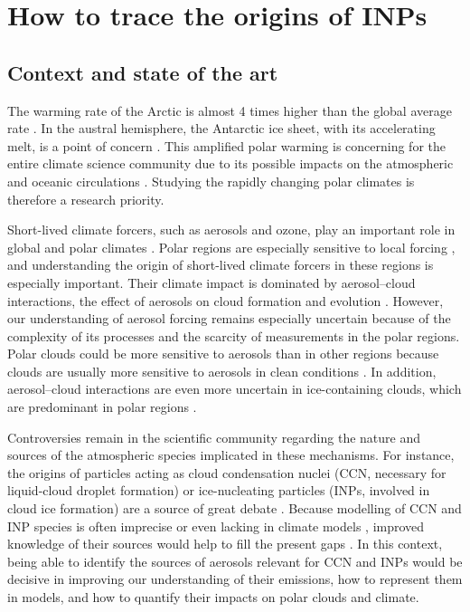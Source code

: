 \section{How to trace the origins of INPs}
\label{sec:paper1}
    \subsection{Context and state of the art}
    \label{P1sec:intro}

    The warming rate of the Arctic is almost 4 times higher than the global average  rate \citep{rantanen_arctic_2022}.
    In the austral hemisphere, the Antarctic ice sheet, with its accelerating melt, is a point of concern \citep{bronselaer_change_2018}. This amplified polar warming is concerning for the entire climate science community due to its possible impacts on the atmospheric and oceanic circulations \citep{serreze_processes_2011}.
    Studying the rapidly changing polar climates is therefore a research priority.

    Short-lived climate forcers, such as aerosols and ozone, play an important role in global and polar climates \citep{ipcc_sixth_2021}. Polar regions are especially sensitive to local forcing \citep{stuecker_polar_2018}, and understanding the origin of short-lived climate forcers in these regions is especially important. Their climate impact is dominated by aerosol--cloud interactions, the effect of aerosols on cloud formation and evolution \citep{storelvmo_aerosol_2017}. However, our understanding of aerosol forcing remains especially uncertain because of the complexity of its processes and the scarcity of measurements in the polar regions. Polar clouds could be more sensitive to aerosols than in other regions because clouds are usually more sensitive to aerosols in clean conditions \citep{carslaw_large_2013}. In addition, aerosol--cloud interactions are even more uncertain in ice-containing clouds, which are predominant in polar regions \citep{matus_role_2017}.

    Controversies remain in the scientific community regarding the nature and sources of the atmospheric species implicated in these mechanisms.
    For instance, the origins of particles acting as cloud condensation nuclei (CCN, necessary for liquid-cloud droplet formation) or ice-nucleating particles (INPs, involved in cloud ice formation) are a source of great debate \citep[e.g.][]{zhao_global_2024}.
    Because modelling of CCN and INP species is often imprecise or even lacking in climate models \citep{morrison_confronting_2020}, improved knowledge of their sources would help to fill the present gaps \citep{murray_opinion_2021}.
    In this context, being able to identify the sources of aerosols relevant for CCN and INPs would be decisive in improving our understanding of their emissions, how to represent them in models, and how to quantify their impacts on polar clouds and climate.

